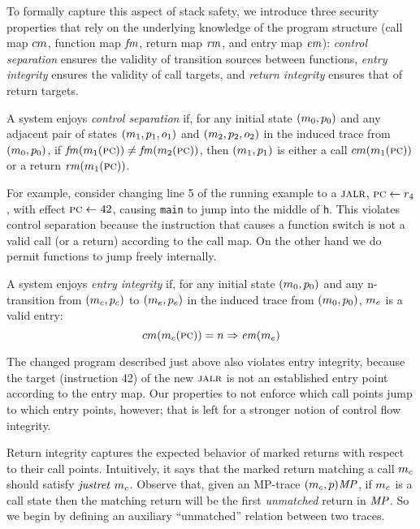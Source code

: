 \documentclass[acmsmall,review,anonymous]{acmart}\settopmatter{printfolios=true,printccs=false,printacmref=false}
\begin{document}
{To formally capture this aspect of stack safety, we introduce three
security properties that rely on the underlying knowledge of the
program structure (call map $cm$, function map $\mathit{fm}$, return map $\mathit{rm}$, and entry
map $\mathit{em}$): {\em control separation} ensures the validity of transition
sources between functions, {\em entry integrity} ensures the validity
of call targets, and {\em return integrity} ensures that of
return targets.

A system enjoys {\em control separation}
if, for any initial state \((m_0, p_0)\) and any adjacent pair of states
\((m_1,p_1,o_1)\) and \((m_2,p_2,o_2)\)
in the induced trace from \((m_0,p_0)\),
if \(\mathit{fm}(m_1(\textsc{pc})) \not = \mathit{fm}(m_2(\textsc{pc}))\),
then \((m_1,p_1)\) is either a call \(cm(m_1(\textsc{pc}))\)
or a return \(\mathit{rm}(m_1(\textsc{pc}))\).

\smallskip

For example, consider changing line 5 of the running example to a $\textsc{jalr}$,
$\textsc{pc} \leftarrow r_4$, with effect $\textsc{pc} \leftarrow 42$, causing {\tt main}
to jump into the middle of {\tt h}.
This violates control separation because the instruction that causes a
function switch is not a valid call (or a return) according to the
call map. On the other hand we do permit functions to jump freely internally.

A system enjoys {\em entry integrity}
if, for any initial state \((m_0, p_0)\)
and any n-transition from \((m_c,p_c)\) to
\((m_e, p_e)\) in the induced trace from
\((m_0,p_0)\), $m_e$ is a valid entry:
\[cm(m_c(\textsc{pc})) = n \Rightarrow \mathit{em}(m_e)\]

The changed program described just above also violates entry integrity,
because the target (instruction 42) of the new $\textsc{jalr}$ is not an established
entry point according to the entry map. Our properties to not enforce which
call points jump to which entry points, however; that is left for a stronger
notion of control flow integrity.

\newcommand*{\Unmatched}{\mathit{um}}

Return integrity captures the expected behavior of marked returns with
respect to their call points. Intuitively, it says that the marked return
matching a call $m_c$ should satisfy $\mathit{justret}\ m_c$.
Observe that, given an MP-trace $(m_c,p)\mathit{MP}$, if $m_c$ is
a call state then the matching return will be the first \emph{unmatched} return
in $\mathit{MP}$. So we begin by defining an auxiliary ``unmatched'' relation between
two traces.

}
\end{document}
